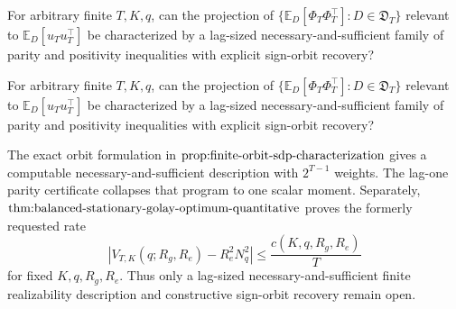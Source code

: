 For arbitrary finite \(T,K,q\), can the projection of \(\{\mathbb E_D[\Phi_T\Phi_T^{\top}]:D\in\mathfrak D_T\}\) relevant to \(\mathbb E_D[u_Tu_T^{\top}]\) be characterized by a lag-sized necessary-and-sufficient family of parity and positivity inequalities with explicit sign-orbit recovery?

For arbitrary finite \(T,K,q\), can the projection of \(\{\mathbb E_D[\Phi_T\Phi_T^{\top}]:D\in\mathfrak D_T\}\) relevant to \(\mathbb E_D[u_Tu_T^{\top}]\) be characterized by a lag-sized necessary-and-sufficient family of parity and positivity inequalities with explicit sign-orbit recovery?

The exact orbit formulation in \(\textnormal{prop:finite-orbit-sdp-characterization}\) gives a computable necessary-and-sufficient description with \(2^{T-1}\) weights.  The lag-one parity certificate collapses that program to one scalar moment.  Separately, \(\textnormal{thm:balanced-stationary-golay-optimum-quantitative}\) proves the formerly requested rate
\[
\left|V_{T,K}(q;R_g,R_e)-R_e^2N_q^2\right|
\le \frac{c(K,q,R_g,R_e)}{T}
\]
for fixed \(K,q,R_g,R_e\).  Thus only a lag-sized necessary-and-sufficient finite realizability description and constructive sign-orbit recovery remain open.
